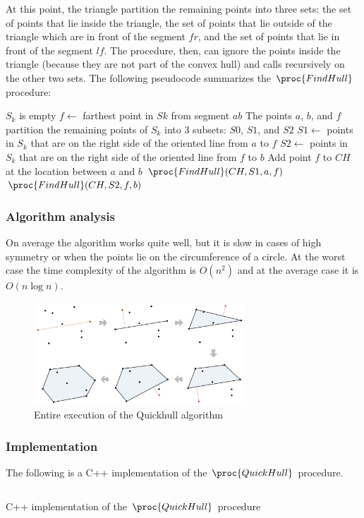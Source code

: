 \documentclass{article}
\begin{document}
At this point, the triangle partition the remaining points into three sets: the set of points that lie inside the triangle, the set of points that lie outside of the triangle which are in front of the segment $fr$, and the set of points that lie in front of the segment $lf$. The procedure, then, can ignore the points inside the triangle (because they are not part of the convex hull) and calls recursively on the other two sets. The following pseudocode summarizes the $\proc{FindHull}$ procedure: 

\begin{codebox}
\li \If $S_k$ is empty
\li \Then \Return \End
\li $f \gets $ farthest point in $Sk$ from segment $ab$
\li \Comment The points $a$, $b$, and $f$ partition the remaining points of $S_k$ into 3 subsets: $S0$, $S1$, and $S2$
\li $S1 \gets $ points in $S_k$ that are on the right side of the oriented line from $a$ to $f$
\li $S2 \gets $ points in $S_k$ that are on the right side of the oriented line from $f$ to $b$
\li
\li Add point $f$ to $CH$ at the location between $a$ and $b$
\li $\proc{FindHull}(CH, S1, a, f)$
\li $\proc{FindHull}(CH, S2, f, b)$
\end{codebox}

\subsubsection*{Algorithm analysis}
On average the algorithm works quite well, but it is slow in cases of high symmetry or when the points lie on the circumference of a circle. At the worst case the time complexity of the algorithm is $O(n^2)$ and at the average case it is $O(n\log{n})$.

\begin{figure}[h]
\centering
\includegraphics[width=0.7\textwidth]{quickhull/quickhull_visual.png}
\caption{\label{fig:quick_visual}Entire execution of the Quickhull algorithm}
\end{figure}

\subsubsection*{Implementation}
The following is a C++ implementation of the $\proc{QuickHull}$ procedure.
\begin{listing}[H]
    \inputminted[linenos]{cpp}{code/quickhull.cpp}
    \caption{C++ implementation of the $\proc{QuickHull}$ procedure}
\end{listing}
\end{document}

